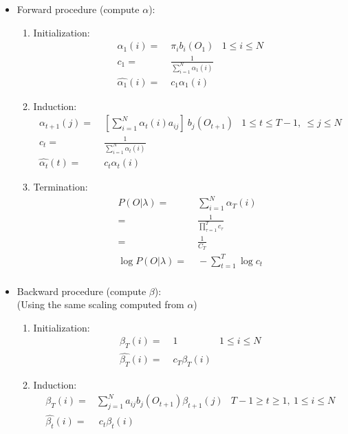 \documentclass[english]{article}
\begin{document}
\begin{itemize}
\item Forward procedure (compute $\alpha$):

\begin{enumerate}
	\item Initialization:
	\begin{align*}
	\alpha_1(i) =&\; \pi_i b_i(O_1) & 1 \leq i \leq N \\
	c_1 =&\; \frac{1}{\sum_{i=1}^N \alpha_1(i)} \\
	\hat{\alpha_1}(i) =&\; c_1 \alpha_1(i)  
	\end{align*}

	\item Induction:
	\begin{align*}
	\alpha_{t+1}(j) =&\; [ \sum_{i=1}^N \alpha_t(i) a_{ij} ] \ b_j(O_{t+1}) & 1 \leq t \leq T-1, \ \leq j \leq N \\
	c_t =&\; \frac{1}{\sum_{i=1}^N \alpha_t(i)} \\
	\hat{\alpha_t}(t) =&\; c_t \alpha_t(i)  
	\end{align*}

	\item Termination:
	\begin{align*}
	P(O|\lambda) =&\; \sum_{i=1}^N \alpha_T(i) \\
	=&\; \frac{1}{\prod_{\tau=1}^T c_{\tau}} \\ 
	=&\; \frac{1}{C_T} \\ 
	\log{P(O|\lambda)} =&\;  -\sum_{t=1}^T \log{c_t}\\
	\end{align*}
\end{enumerate}

\item Backward procedure (compute $\beta$):
\\(Using the same scaling computed from $\alpha$)
\begin{enumerate}
	\item Initialization:
	\begin{align*}
	\beta_T(i) =&\; 1  & 1 \leq i \leq N \\
	\hat{\beta_T}(i) =&\; c_T \beta_T(i)
	\end{align*}

	\item Induction:
	\begin{align*}
	\beta_T(i) =& \sum_{j=1}^N a_{ij} b_j(O_{t+1}) \beta_{t+1}(j) & T-1 \geq t \geq 1, \ 1 \leq i \leq N \\
	\hat{\beta_t}(i) =&\; c_t \beta_t(i)	
	\end{align*}

\end{enumerate}
\end{itemize} 
\end{document}
